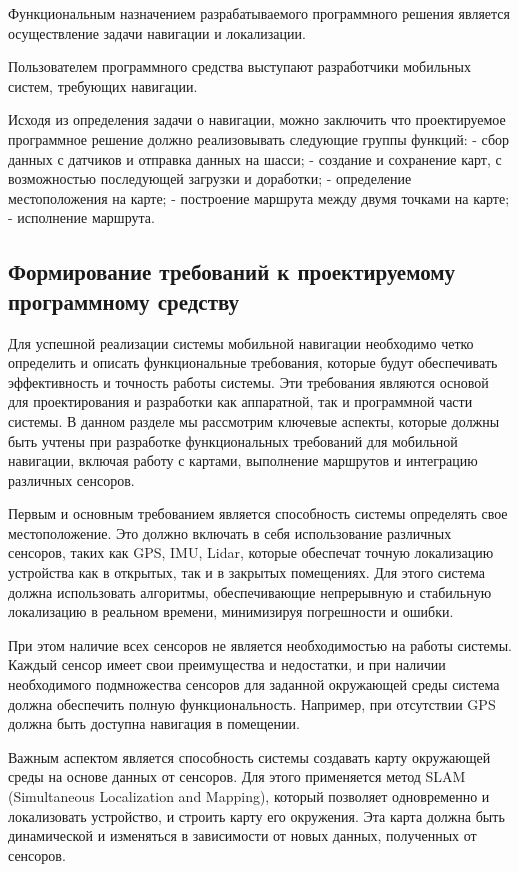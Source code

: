 Функциональным назначением разрабатываемого программного решения является
осуществление задачи навигации и локализации.

Пользователем программного средства выступают разработчики мобильных систем,
требующих навигации.

Исходя из определения задачи о навигации, можно заключить что проектируемое
программное решение должно реализовывать следующие группы функций:
- сбор данных с датчиков и отправка данных на шасси;
- создание и сохранение карт, с возможностью последующей загрузки и доработки;
- определение местоположения на карте;
- построение маршрута между двумя точками на карте;
- исполнение маршрута.

\subsection{Формирование требований к проектируемому программному средству}

Для успешной реализации системы мобильной навигации необходимо четко определить
и описать функциональные требования, которые будут обеспечивать эффективность и
точность работы системы. Эти требования являются основой для проектирования и
разработки как аппаратной, так и программной части системы. В данном разделе мы
рассмотрим ключевые аспекты, которые должны быть учтены при разработке
функциональных требований для мобильной навигации, включая работу с картами,
выполнение маршрутов и интеграцию различных сенсоров.

Первым и основным требованием является способность системы определять свое
местоположение. Это должно включать в себя использование различных сенсоров,
таких как GPS, IMU, Lidar, которые обеспечат точную локализацию устройства как в
открытых, так и в закрытых помещениях. Для этого система должна использовать
алгоритмы, обеспечивающие непрерывную и стабильную локализацию в реальном
времени, минимизируя погрешности и ошибки.

При этом наличие всех сенсоров не является необходимостью на работы системы.
Каждый сенсор имеет свои преимущества и недостатки, и при наличии необходимого
подмножества сенсоров для заданной окружающей среды система должна обеспечить
полную функциональность. Например, при отсутствии GPS должна быть доступна
навигация в помещении.

Важным аспектом является способность системы создавать карту окружающей среды на
основе данных от сенсоров. Для этого применяется метод SLAM (Simultaneous
Localization and Mapping), который позволяет одновременно и локализовать
устройство, и строить карту его окружения. Эта карта должна быть динамической и
изменяться в зависимости от новых данных, полученных от сенсоров.

